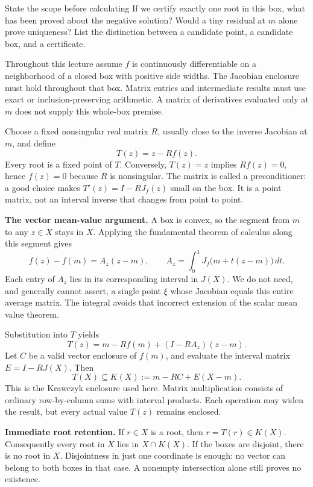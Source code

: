 \begin{question}{State the scope before calculating}
If we certify exactly one root in this box, what has been proved about the
negative solution? Would a tiny residual at $m$ alone prove uniqueness?
List the distinction between a candidate point, a candidate box, and a certificate.
\end{question}

Throughout this lecture assume $f$ is continuously differentiable on a
neighborhood of a closed box with positive side widths. The Jacobian
enclosure must hold throughout that box. Matrix entries and intermediate
results must use exact or inclusion-preserving arithmetic. A matrix of
derivatives evaluated only at $m$ does not supply this whole-box premise.

\newpage
{}
Choose a fixed nonsingular real matrix $R$, usually close to the inverse
Jacobian at $m$, and define
\[
                         T(z)=z-Rf(z).
\]
Every root is a fixed point of $T$. Conversely, $T(z)=z$ implies
$Rf(z)=0$, hence $f(z)=0$ because $R$ is nonsingular. The matrix is called
a preconditioner: a good choice makes $T'(z)=I-RJ_f(z)$ small on the box.
It is a point matrix, not an interval inverse that changes from point to point.

\textbf{The vector mean-value argument.} A box is convex, so the segment
from $m$ to any $z\in X$ stays in $X$. Applying the fundamental theorem of
calculus along this segment gives
\[
 f(z)-f(m)=A_z(z-m),\qquad
 A_z=\int_0^1 J_f\bigl(m+t(z-m)\bigr)\,dt.
\]
Each entry of $A_z$ lies in its corresponding interval in $J(X)$.
We do not need, and generally cannot assert, a single point $\xi$ whose
Jacobian equals this entire average matrix. The integral avoids that
incorrect extension of the scalar mean value theorem.

Substitution into $T$ yields
\[
 T(z)=m-Rf(m)+(I-RA_z)(z-m).
\]
Let $C$ be a valid vector enclosure of $f(m)$, and evaluate the interval
matrix $E=I-RJ(X)$. Then
\[
                  T(X)\subseteq K(X):=m-RC+E(X-m).
\]
This is the Krawczyk enclosure used here. Matrix multiplication consists of
ordinary row-by-column sums with interval products. Each operation may
widen the result, but every actual value $T(z)$ remains enclosed.

\textbf{Immediate root retention.} If $r\in X$ is a root, then
$r=T(r)\in K(X)$. Consequently every root in $X$ lies in $X\cap K(X)$.
If the boxes are disjoint, there is no root in $X$. Disjointness in just one
coordinate is enough: no vector can belong to both boxes in that case.
A nonempty intersection alone still proves no existence.

